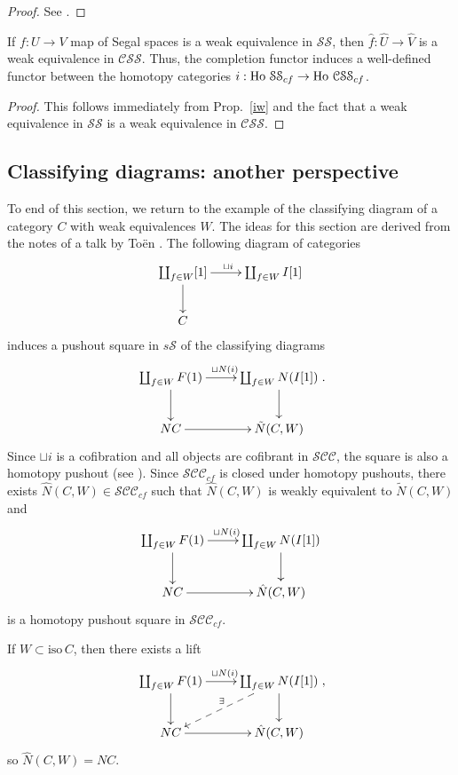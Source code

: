 \begin{refsection}
\begin{proof}
See \cite[Sec.~14]{rezk}.
\end{proof}

\begin{cor}
If $f:U\to V$ map of Segal spaces is a weak equivalence in $\mathcal{SS}$, then $\hat f:\hat U\to\hat V$ is a weak equivalence in $\mathcal{CSS}$. Thus, the completion functor induces a well-defined functor between the homotopy categories $i:\operatorname{\mathrm{Ho} \,}\mathcal{SS}_{cf}\to\operatorname{\mathrm{Ho} \,}\mathcal{CSS}_{cf}$.
\end{cor}
\begin{proof}
This follows immediately from Prop.~\ref{iw} and the fact that a weak equivalence in $\mathcal{SS}$ is a weak equivalence in $\mathcal{CSS}$.
\end{proof}

\subsection{Classifying diagrams: another perspective}\label{sslocal}
To end of this section, we return to the example of the classifying diagram of a category $C$ with weak equivalences $W$. The ideas for this section are derived from the notes of a talk by To\"en \cite{toentalksegal}. The following diagram of categories
\begin{equation} \label{seglocalpushout}
\xymatrix{\coprod_{f\in W}[1]\ar[r]^{\sqcup i}\ar[d]&\coprod_{f\in W}I[1]\\C}
\end{equation}
induces a pushout square in $s\mathcal S$ of the classifying diagrams
\[
\xymatrix{
\coprod_{f \in W} F(1)\ar[r]^{\sqcup N(i)}\ar[d] & \coprod_{f\in W} N(I[1]) \ar[d] \\ NC\ar[r]&\tilde N(C,W)
}.
\]
Since $\sqcup i$ is a cofibration and all objects are cofibrant in $\mathcal{SCC}$, the square is also a homotopy pushout (see \cite[Prop A.2.2.4]{htt}). Since $\mathcal{SCC}_{cf}$ is closed under homotopy pushouts, there exists $\hat N(C,W)\in\mathcal{SCC}_{cf}$ such that $\hat N(C,W)$ is weakly equivalent to $\tilde N(C,W)$ and
$$\xymatrix{\coprod_{f\in W}F(1)\ar[r]^{\sqcup N(i)}\ar[d]&\coprod_{f\in W}N(I[1])\ar[d]\\NC\ar[r]&\hat N(C,W)}$$
is a homotopy pushout square in $\mathcal{SCC}_{cf}$.

If $W\subset\mathrm{iso}\,C$, then there exists a lift
$$\xymatrix{\coprod_{f\in W}F(1)\ar[r]^{\sqcup N(i)}\ar[d]&\coprod_{f\in W}N(I[1])\ar[d]\ar@{-->}[dl]_{\exists}\\NC\ar[r]&\hat N(C,W)},$$
so $\hat N(C,W)=NC$.


\end{refsection}
